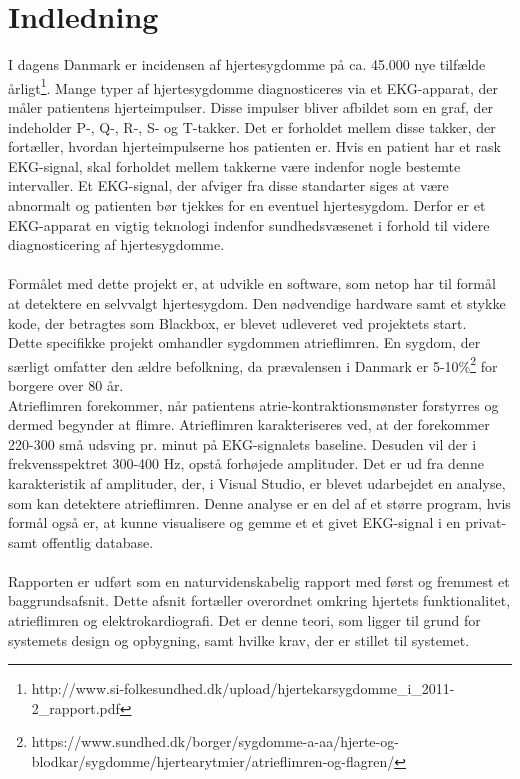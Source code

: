 \chapter{Indledning}
I dagens Danmark er incidensen af hjertesygdomme på ca. 45.000 nye tilfælde årligt\footnote{http://www.si-folkesundhed.dk/upload/hjertekarsygdomme\_i\_2011-2\_rapport.pdf}. Mange typer af hjertesygdomme diagnosticeres via et EKG-apparat, der måler patientens hjerteimpulser. Disse impulser bliver afbildet som en graf, der indeholder P-, Q-, R-, S- og T-takker. Det er forholdet mellem disse takker, der fortæller, hvordan hjerteimpulserne hos patienten er. Hvis en patient har et rask EKG-signal, skal forholdet mellem takkerne være indenfor nogle bestemte intervaller. Et EKG-signal, der afviger fra disse standarter siges at være abnormalt og patienten bør tjekkes for en eventuel hjertesygdom. Derfor er et EKG-apparat en vigtig teknologi indenfor sundhedsvæsenet i forhold til videre diagnosticering af hjertesygdomme.\\ \\
Formålet med dette projekt er, at udvikle en software, som netop har til formål at detektere en selvvalgt hjertesygdom. Den nødvendige hardware samt et stykke kode, der betragtes som Blackbox, er blevet udleveret ved projektets start.\\
Dette specifikke projekt omhandler sygdommen atrieflimren. En sygdom, der særligt omfatter den ældre befolkning, da prævalensen i Danmark er 5-10\%\footnote{https://www.sundhed.dk/borger/sygdomme-a-aa/hjerte-og-blodkar/sygdomme/hjertearytmier/atrieflimren-og-flagren/} for borgere over 80 år.\\
Atrieflimren forekommer, når patientens atrie-kontraktionsmønster forstyrres og dermed begynder at flimre. Atrieflimren karakteriseres ved, at der forekommer 220-300 små udsving pr. minut på EKG-signalets baseline. Desuden vil der i frekvensspektret 300-400 Hz, opstå forhøjede amplituder. Det er ud fra denne karakteristik af amplituder, der, i Visual Studio, er blevet udarbejdet en analyse, som kan detektere atrieflimren. Denne analyse er en del af et større program, hvis formål også er, at kunne visualisere og gemme et et givet EKG-signal i en privat- samt offentlig database. \\ \\
Rapporten er udført som en naturvidenskabelig rapport med først og fremmest et baggrundsafsnit. Dette afsnit fortæller overordnet omkring hjertets funktionalitet, atrieflimren og elektrokardiografi. Det er denne teori, som ligger til grund for systemets design og opbygning, samt hvilke krav, der er stillet til systemet.
  
